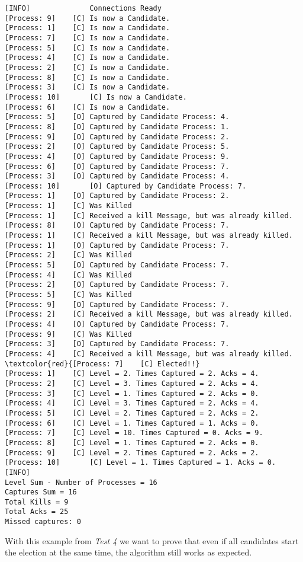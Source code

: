 	\begin{Verbatim}[commandchars=\\\{\},codes={\catcode`$=3\catcode`_=8},frame=single,label=Test 4 output]
[INFO]	  			Connections Ready
[Process: 9]	[C]	Is now a Candidate.
[Process: 1]	[C]	Is now a Candidate.
[Process: 7]	[C]	Is now a Candidate.
[Process: 5]	[C]	Is now a Candidate.
[Process: 4]	[C]	Is now a Candidate.
[Process: 2]	[C]	Is now a Candidate.
[Process: 8]	[C]	Is now a Candidate.
[Process: 3]	[C]	Is now a Candidate.
[Process: 10]       [C]	Is now a Candidate.
[Process: 6]	[C]	Is now a Candidate.
[Process: 5]	[O]	Captured by Candidate Process: 4.
[Process: 8]	[O]	Captured by Candidate Process: 1.
[Process: 9]	[O]	Captured by Candidate Process: 2.
[Process: 2]	[O]	Captured by Candidate Process: 5.
[Process: 4]	[O]	Captured by Candidate Process: 9.
[Process: 6]	[O]	Captured by Candidate Process: 7.
[Process: 3]	[O]	Captured by Candidate Process: 4.
[Process: 10]       [O]	Captured by Candidate Process: 7.
[Process: 1]	[O]	Captured by Candidate Process: 2.
[Process: 1]	[C]	Was Killed
[Process: 1]	[C]	Received a kill Message, but was already killed.
[Process: 8]	[O]	Captured by Candidate Process: 7.
[Process: 1]	[C]	Received a kill Message, but was already killed.
[Process: 1]	[O]	Captured by Candidate Process: 7.
[Process: 2]	[C]	Was Killed
[Process: 5]	[O]	Captured by Candidate Process: 7.
[Process: 4]	[C]	Was Killed
[Process: 2]	[O]	Captured by Candidate Process: 7.
[Process: 5]	[C]	Was Killed
[Process: 9]	[O]	Captured by Candidate Process: 7.
[Process: 2]	[C]	Received a kill Message, but was already killed.
[Process: 4]	[O]	Captured by Candidate Process: 7.
[Process: 9]	[C]	Was Killed
[Process: 3]	[O]	Captured by Candidate Process: 7.
[Process: 4]	[C]	Received a kill Message, but was already killed.
\textcolor{red}{[Process: 7]	[C]	Elected!!}
[Process: 1]	[C]	Level = 2. Times Captured = 2. Acks = 4.
[Process: 2]	[C]	Level = 3. Times Captured = 2. Acks = 4.
[Process: 3]	[C]	Level = 1. Times Captured = 2. Acks = 0.
[Process: 4]	[C]	Level = 3. Times Captured = 2. Acks = 4.
[Process: 5]	[C]	Level = 2. Times Captured = 2. Acks = 2.
[Process: 6]	[C]	Level = 1. Times Captured = 1. Acks = 0.
[Process: 7]	[C]	Level = 10. Times Captured = 0. Acks = 9.
[Process: 8]	[C]	Level = 1. Times Captured = 2. Acks = 0.
[Process: 9]	[C]	Level = 2. Times Captured = 2. Acks = 2.
[Process: 10]       [C]	Level = 1. Times Captured = 1. Acks = 0.
[INFO]		
Level Sum - Number of Processes = 16	
Captures Sum = 16
Total Kills = 9	
Total Acks = 25
Missed captures: 0
	\end{Verbatim}

	\vspace{10pt}

	With this example from \textit{Test 4} we want to prove that even if all candidates start the election at the same time, the algorithm still works as expected.
